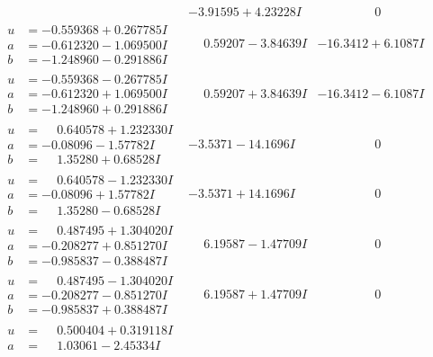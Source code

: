\documentclass[1p]{elsarticle_modified}
\theoremstyle{definition}
\begin{document}
$$\begin{array}{c|c|c}
 & -3.91595 + 4.23228 I & \phantom{-0.000000 } 0 \\ \hline\begin{aligned}
u &= -0.559368 + 0.267785 I \\
a &= -0.612320 - 1.069500 I \\
b &= -1.248960 - 0.291886 I\end{aligned}
 & \phantom{-}0.59207 - 3.84639 I & -16.3412 + 6.1087 I \\ \hline\begin{aligned}
u &= -0.559368 - 0.267785 I \\
a &= -0.612320 + 1.069500 I \\
b &= -1.248960 + 0.291886 I\end{aligned}
 & \phantom{-}0.59207 + 3.84639 I & -16.3412 - 6.1087 I \\ \hline\begin{aligned}
u &= \phantom{-}0.640578 + 1.232330 I \\
a &= -0.08096 - 1.57782 I \\
b &= \phantom{-}1.35280 + 0.68528 I\end{aligned}
 & -3.5371 - 14.1696 I & \phantom{-0.000000 } 0 \\ \hline\begin{aligned}
u &= \phantom{-}0.640578 - 1.232330 I \\
a &= -0.08096 + 1.57782 I \\
b &= \phantom{-}1.35280 - 0.68528 I\end{aligned}
 & -3.5371 + 14.1696 I & \phantom{-0.000000 } 0 \\ \hline\begin{aligned}
u &= \phantom{-}0.487495 + 1.304020 I \\
a &= -0.208277 + 0.851270 I \\
b &= -0.985837 - 0.388487 I\end{aligned}
 & \phantom{-}6.19587 - 1.47709 I & \phantom{-0.000000 } 0 \\ \hline\begin{aligned}
u &= \phantom{-}0.487495 - 1.304020 I \\
a &= -0.208277 - 0.851270 I \\
b &= -0.985837 + 0.388487 I\end{aligned}
 & \phantom{-}6.19587 + 1.47709 I & \phantom{-0.000000 } 0 \\ \hline\begin{aligned}
u &= \phantom{-}0.500404 + 0.319118 I \\
a &= \phantom{-}1.03061 - 2.45334 I \\

\end{aligned}
\end{array}$$
\end{document}
